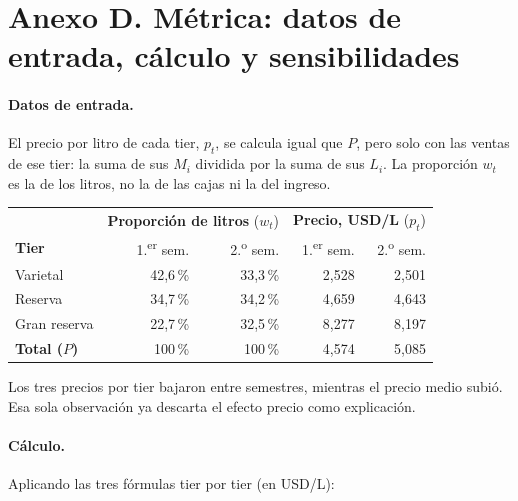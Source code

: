 
\section*{Anexo D. Métrica: datos de entrada, cálculo y sensibilidades}

\paragraph{Datos de entrada.} El precio por litro de cada tier, $p_t$, se calcula igual que $P$, pero solo con las ventas de ese tier: la suma de sus $M_i$ dividida por la suma de sus $L_i$. La proporción $w_t$ es la de los litros, no la de las cajas ni la del ingreso.

\begin{center}
\small
\begin{tabular}{l r r r r}
\hline
& \multicolumn{2}{c}{\textbf{Proporción de litros} ($w_t$)} & \multicolumn{2}{c}{\textbf{Precio, USD/L} ($p_t$)} \\
\textbf{Tier} & 1.\textsuperscript{er} sem. & 2.\textsuperscript{o} sem. & 1.\textsuperscript{er} sem. & 2.\textsuperscript{o} sem. \\
\hline
Varietal     & 42,6\,\% & 33,3\,\% & 2,528 & 2,501 \\
Reserva      & 34,7\,\% & 34,2\,\% & 4,659 & 4,643 \\
Gran reserva & 22,7\,\% & 32,5\,\% & 8,277 & 8,197 \\
\hline
\textbf{Total ($P$)} & 100\,\% & 100\,\% & 4,574 & 5,085 \\
\hline
\end{tabular}
\end{center}

\noindent Los tres precios por tier bajaron entre semestres, mientras el precio medio subió. Esa sola observación ya descarta el efecto precio como explicación.

\paragraph{Cálculo.} Aplicando las tres fórmulas tier por tier (en USD/L):

